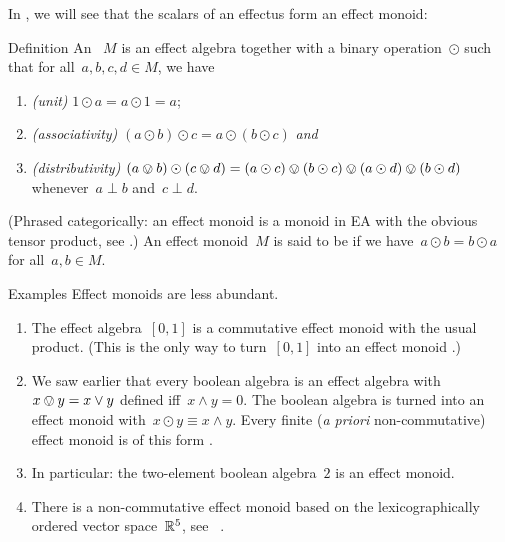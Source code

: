 \documentclass[b]{subfiles}
\begin{document}
\begin{parsec}%
\begin{point}%
In , we will see that the scalars of an effectus
form an effect monoid:
\end{point}
\begin{point}{Definition}%
An ~$M$ \cite{probdistrconv}
    is an effect algebra
    together with a binary operation~$\odot$
    such that for all~$a,b,c,d \in M$, we have
\begin{enumerate}
    \item \emph{(unit)}
    $1 \odot a = a \odot 1 = a$;
\item \emph{(associativity)}
    $(a \odot b) \odot c 
    =a \odot (b \odot c)$ \emph{and}
\item \emph{(distributivity)}
    $(a \ovee b) \odot (c \ovee d)
            = (a \odot c) \ovee (b \odot c) \ovee
            (a \odot d) \ovee (b \odot d)$
            whenever~$a \perp b$ and~$c \perp d$.
\end{enumerate}
(Phrased categorically:
    an effect monoid is a monoid in \textsf{EA}
    with the obvious tensor product, see \cite{corefl,probdistrconv}.)
An effect monoid~$M$ is said to be 
    if we have~$a\odot b = b\odot a$ for all~$a,b \in M$.
\end{point}
\begin{point}{Examples}%
Effect monoids are less abundant.
\begin{enumerate}
\item The effect algebra~$[0,1]$
        is a commutative effect monoid with the usual product.
        (This is the only way to turn~$[0,1]$ into an effect monoid
                \cite[Prop.~41]{basmsc}.)
\item We saw earlier that every boolean algebra is an effect algebra
        with~$x \ovee y = x \vee y$ defined iff~$x \wedge y = 0$.
    The boolean algebra is turned into an effect monoid
        with~$x \odot y \equiv x \wedge y$.
    Every finite (\emph{a priori} non-commutative) effect monoid
    is of this form \cite[Prop.~40]{basmsc}.
\item
In particular: the two-element boolean algebra~$2$
    is an effect monoid.
\item There is a non-commutative effect monoid
        based on the lexicographically ordered vector space~$\mathbb{R}^5$,
        see ~\cite[Cor.~51]{basmsc}.
\end{enumerate}
\end{point}
\end{parsec}
\end{document}
